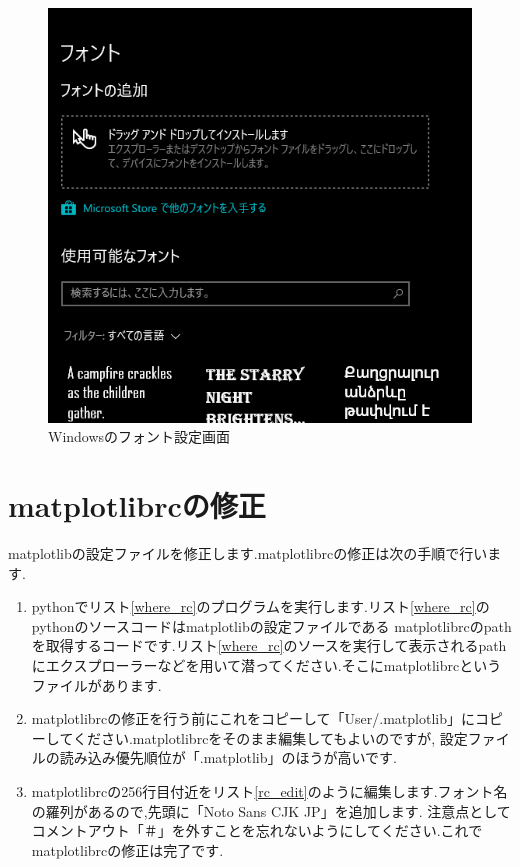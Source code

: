 \documentclass[a4j]{jarticle}
\begin{document}
              \begin{figure}[H]
                \centering
                \includegraphics[scale=0.5]{fontsetting.png}
                \caption{Windowsのフォント設定画面}
                 \label{fontsetteing}
                \end{figure}
    
    \section{matplotlibrcの修正}
    matplotlibの設定ファイルを修正します.matplotlibrcの修正は次の手順で行います.
    \begin{enumerate}
      \item pythonでリスト\ref{where_rc}のプログラムを実行します.リスト\ref{where_rc}のpythonのソースコードはmatplotlibの設定ファイルである
      matplotlibrcのpathを取得するコードです.リスト\ref{where_rc}のソースを実行して表示されるpathにエクスプローラーなどを用いて潜ってください.そこにmatplotlibrcというファイルがあります.
      \item matplotlibrcの修正を行う前にこれをコピーして「User/.matplotlib」にコピーしてください.matplotlibrcをそのまま編集してもよいのですが,
      設定ファイルの読み込み優先順位が「.matplotlib」のほうが高いです.
      \item matplotlibrcの256行目付近をリスト\ref{rc_edit}のように編集します.フォント名の羅列があるので,先頭に「Noto Sans CJK JP」を追加します.
      注意点としてコメントアウト「＃」を外すことを忘れないようにしてください.これでmatplotlibrcの修正は完了です.
      \end{enumerate}
\end{document}
